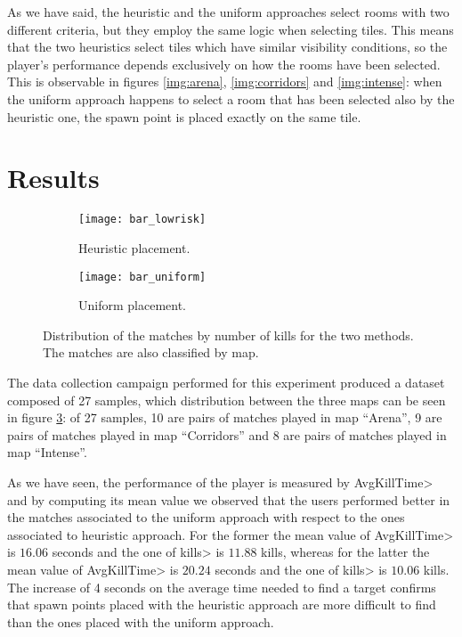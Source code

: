 As we have said, the heuristic and the uniform approaches select rooms with two different criteria, but they employ the same logic when selecting tiles. This means that the two heuristics select tiles which have similar visibility conditions, so the player's performance depends exclusively on how the rooms have been selected. This is observable in figures \ref{img:arena}, \ref{img:corridors} and \ref{img:intense}: when the uniform approach happens to select a room that has been selected also by the heuristic one, the spawn point is placed exactly on the same tile.


\section{Results}

\begin{figure}
\centering
\begin{subfigure}[t]{0.8\linewidth}
\texttt{[image: bar\_lowrisk]}
\caption{Heuristic placement.}
\label{img:bar_lowrisk}
\end{subfigure} 
\begin{subfigure}[t]{0.8\linewidth}
\texttt{[image: bar\_uniform]}
\caption{Uniform placement.}
\label{img:bar_uniform}
\end{subfigure}
\caption[Distribution of the matches by number of kills for the two methods.]{Distribution of the matches by number of kills for the two methods. The matches are also classified by map.}
\label{img:match_distribution} 
\end{figure}

The data collection campaign performed for this experiment produced a dataset composed of 27 samples, which distribution between the three maps can be seen in figure \ref{img:match_distribution}: of 27 samples, 10 are pairs of matches played in map ``Arena'', 9 are pairs of matches played in map ``Corridors'' and 8 are pairs of matches played in map ``Intense''. 

\par

As we have seen, the performance of the player is measured by \<AvgKillTime> and by computing its mean value we observed that the users performed better in the matches associated to the uniform approach with respect to the ones associated to heuristic approach. For the former the mean value of \<AvgKillTime> is $16.06$ seconds and the one of \<kills> is $11.88$ kills, whereas for the latter the mean value of \<AvgKillTime> is $20.24$ seconds and the one of \<kills> is $10.06$ kills. The increase of 4 seconds on the average time needed to find a target confirms that spawn points placed with the heuristic approach are more difficult to find than the ones placed with the uniform approach.


